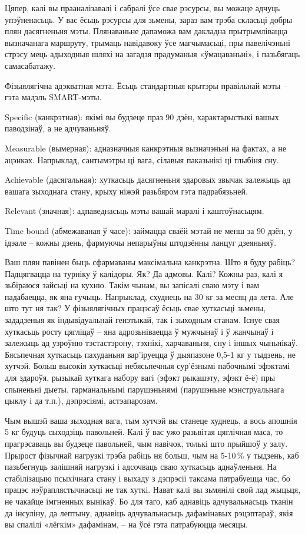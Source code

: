 Цяпер, калі вы прааналізавалі і сабралі ўсе свае рэсурсы, вы можаце адчуць упэўненасьць. У вас ёсьць рэсурсы для зьмены, зараз вам трэба скласьці добры плян дасягненьня мэты. Плянаваньне дапаможа вам дакладна прытрымлівацца вызначанага маршруту, трымаць навідавоку ўсе магчымасьці, пры павелічэньні стрэсу мець адыходныя шляхі на загадзя прадуманыя «ўмацаваньні», і пазьбягаць самасабатажу.

Фізыялягічна адэкватная мэта. Ёсьць стандартныя крытэры правільнай мэты – гэта мадэль SMART-мэты. 

Specific (канкрэтная): якімі вы будзеце праз 90 дзён, характарыстыкі вашых паводзінаў, а не адчуваньняў. 

Measurable (вымерная): адназначныя канкрэтныя вызначэньні на фактах, а не ацэнках. Напрыклад, сантымэтры ці вага, сілавыя паказьнікі ці глыбіня сну. 

Achievable (дасягальная): хуткасьць дасягненьня здаровых звычак залежыць ад вашага зыходнага стану, крыху ніжэй разьбяром гэта падрабязьней. 

Relevant (значная): адпаведнасьць мэты вашай маралі і каштоўнасьцям. 

Time bound (абмежаваная ў часе): займацца сваёй мэтай не менш за 90 дзён, у ідэале – кожны дзень, фармуючы непарыўны штодзённы ланцуг дзеяньняў. 

Ваш плян павінен быць сфармаваны максімальна канкрэтна. Што я буду рабіць? Падцягвацца на турніку ў калідоры. Як? Да адмовы. Калі? Кожны раз, калі я зьбіраюся зайсьці на кухню. Такім чынам, вы запісалі сваю мэту і вам падабаецца, як яна гучыць. Напрыклад, схуднець на 30 кг за месяц да лета. Але што тут ня так? У фізыялягічных працэсаў ёсьць свае хуткасьці зьмены, зададзеныя як індывідуальнай генэтыкай, так і зыходным станам. Існуе свая хуткасьць росту цягліцаў – яна адрозьніваецца ў мужчынаў і ў жанчынаў і залежыць ад узроўню тэстастэрону, тэхнікі, харчаваньня, сну і іншых чыньнікаў. Бясьпечная хуткасьць пахуданьня вар'іруецца ў дыяпазоне 0,5-1 кг у тыдзень, не хутчэй. Больш высокія хуткасьці небясьпечныя сур'ёзнымі пабочнымі эфэктамі для здароўя, рызыкай хуткага набору вагі (эфэкт рыкашэту, эфэкт ё-ё) пры спыненьні дыеты, гарманальнымі парушэньнямі (парушэньне мэнструальнага цыклу і да т.п.), дэпрэсіямі, астэапарозам. 

Чым вышэй ваша зыходная вага, тым хутчэй вы станеце худнець, а вось апошнія 5 кг будуць сыходзіць павольней. Калі ў вас ужо разьвітая цяглічная маса, то прагрэсаваць вы будзеце павольней, чым навічок, толькі што прыйшоў у залу. Прырост фізычнай нагрузкі трэба рабіць ня больш, чым на 5-10\,\% у тыдзень, каб пазьбегнуць залішняй нагрузкі і адсочваць сваю хуткасьць аднаўленьня. На стабілізацыю псыхічнага стану і выхаду з дэпрэсіі таксама патрабуецца час, бо працэс нэўраплястычнасьці не так хуткі. Нават калі вы зьмянілі свой лад жыцьця, не чакайце імгненных вынікаў. Бо для таго, каб аднавіць адчувальнасьць тканін да інсуліну, да лептыну, аднавіць адчувальнасьць дафамінавых рэцэптараў, якія вы спалілі «лёгкім» дафамінам, – на ўсё гэта патрабуюцца месяцы.

